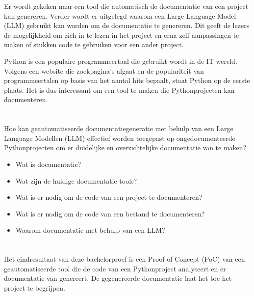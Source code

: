 Er wordt gekeken naar een tool die automatisch de documentatie van een project kan genereren.
Verder wordt er uitgelegd waarom een Large Language Model (LLM) gebruikt kan worden om de documentatie te genereren.
Dit geeft de lezers de mogelijkheid om zich in te lezen in het project en erna zelf aanpassingen te maken of stukken code te gebruiken voor een ander project.

Python is een populaire programmeertaal die gebruikt wordt in de IT wereld.
Volgens \textcite{TIOBE2024} een website die zoekpagina's afgaat en de populariteit van programmeertalen op basis van het aantal hits bepaalt, staat Python op de eerste plaats.
Het is dus interessant om een tool te maken die Pythonprojecten kan documenteren.

\section{}%
\label{sec:onderzoeksvraag}

Hoe kan geautomatiseerde documentatiegeneratie met behulp van een Large Language Modellen (LLM) effectief worden toegepast op ongedocumenteerde Pythonprojecten om er duidelijke en overzichtelijke documentatie van te maken? 

\begin{itemize}
  \item Wat is documentatie?
  \item Wat zijn de huidige documentatie tools?
  \item Wat is er nodig om de code van een project te documenteren?
  \item Wat is er nodig om de code van een bestand te documenteren?
  \item Waarom documentatie met behulp van een LLM?
\end{itemize}

\section{}%
\label{sec:onderzoeksdoelstelling}

Het eindresultaat van deze bachelorproef is een Proof of Concept (PoC) van een geautomatiseerde tool die de code van een Pythonproject analyseert en er documentatie van genereert.
De gegenereerde documentatie laat het toe het project te begrijpen.

\section{}%
\label{sec:opzet-bachelorproef}

